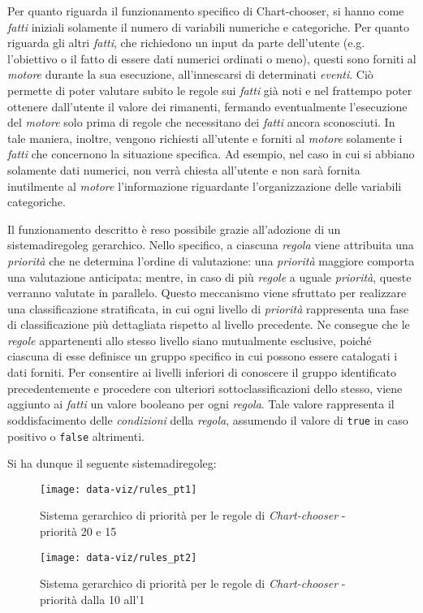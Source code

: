 \bigskip
\noindent Per quanto riguarda il funzionamento specifico di Chart-chooser, si hanno come \emph{fatti} iniziali solamente il numero di variabili numeriche e categoriche. 
Per quanto riguarda gli altri \emph{fatti}, che richiedono un input da parte dell'utente (e.g. l'obiettivo o il fatto di essere dati numerici ordinati o meno), questi sono 
forniti al \emph{motore} durante la sua esecuzione, all'innescarsi di determinati \emph{eventi}. 
Ciò permette di poter valutare subito le regole sui \emph{fatti} già noti e nel frattempo poter ottenere dall'utente il valore dei rimanenti, fermando eventualmente l'esecuzione del \emph{motore} solo
prima di regole che necessitano dei \emph{fatti} ancora sconosciuti. %
In tale maniera, inoltre, vengono richiesti all'utente e forniti al \emph{motore} solamente i \emph{fatti} che concernono la situazione specifica. Ad esempio, nel caso in cui si abbiano solamente dati numerici, 
non verrà chiesta all'utente e non sarà fornita inutilmente al \emph{motore} l'informazione riguardante l'organizzazione delle variabili categoriche.

Il funzionamento descritto è reso possibile grazie all'adozione di un \gls{sistemadiregoleg} gerarchico. Nello specifico, a ciascuna \emph{regola} viene attribuita una \emph{priorità} che ne determina l'ordine di valutazione:
una \emph{priorità} maggiore comporta una valutazione anticipata; mentre, in caso di più \emph{regole} a uguale \emph{priorità}, queste verranno valutate in parallelo.
Questo meccanismo viene sfruttato per realizzare una classificazione stratificata, in cui ogni livello di \emph{priorità} rappresenta una fase di classificazione più dettagliata rispetto al livello precedente. 
Ne consegue che le \emph{regole} appartenenti allo stesso livello siano mutualmente esclusive, poiché ciascuna di esse definisce un gruppo specifico in cui possono essere catalogati i dati forniti.
Per consentire ai livelli inferiori di conoscere il gruppo identificato precedentemente e procedere con ulteriori sottoclassificazioni dello stesso, viene aggiunto ai \emph{fatti} un valore booleano per ogni \emph{regola}. 
Tale valore rappresenta il soddisfacimento delle \emph{condizioni} della \emph{regola}, assumendo il valore di \texttt{true} in caso positivo o \texttt{false} altrimenti.

\bigskip
\noindent Si ha dunque il seguente \gls{sistemadiregoleg}:

\begin{figure}[H] 
    \centering 
    \texttt{[image: data-viz/rules\_pt1]} 
    \caption{Sistema gerarchico di priorità per le regole di \emph{Chart-chooser} - priorità 20 e 15}
    \label{fig:rules_pt1}
\end{figure}
\begin{figure}[H] 
    \centering 
    \texttt{[image: data-viz/rules\_pt2]} 
    \caption{Sistema gerarchico di priorità per le regole di \emph{Chart-chooser} - priorità dalla 10 all'1}
    \label{fig:rules_pt2}
\end{figure}

